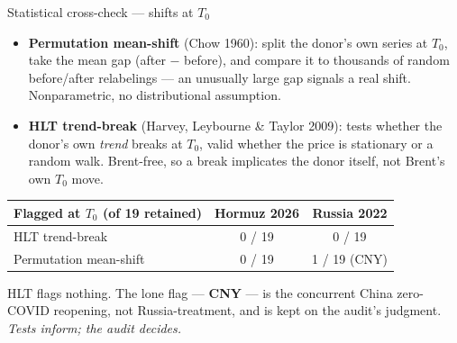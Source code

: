 \documentclass[aspectratio=169,11pt]{beamer}
\newcommand{\src}[1]{{\footnotesize\textcolor{muted}{(#1)}}}
\newcommand{\smalltext}[1]{{\footnotesize\textcolor{muted}{#1}}}
\newcommand{\hd}[1]{\textbf{#1}}
\begin{document}
\begin{frame}{Statistical cross-check --- shifts at $T_0$}
  \begin{itemize}\setlength\itemsep{0.3em}
    \item \hd{Permutation mean-shift} \src{Chow 1960}: split the donor's own series at $T_0$, take the
      mean gap (after $-$ before), and compare it to thousands of random before/after relabelings ---
      an unusually large gap signals a real shift. Nonparametric, no distributional assumption.
    \item \hd{HLT trend-break} \src{Harvey, Leybourne \& Taylor 2009}: tests whether the donor's own
      \emph{trend} breaks at $T_0$, valid whether the price is stationary or a random walk. Brent-free,
      so a break implicates the donor itself, not Brent's own $T_0$ move.
  \end{itemize}

  \vspace{0.4em}
  \begin{center}
  \begin{tabular}{@{}l c c@{}}
    \toprule
    \hd{Flagged at $T_0$ (of 19 retained)} & \hd{Hormuz 2026} & \hd{Russia 2022} \\
    \midrule
    HLT trend-break        & 0 / 19 & 0 / 19 \\
    Permutation mean-shift & 0 / 19 & 1 / 19 \smalltext{(CNY)} \\
    \bottomrule
  \end{tabular}
  \end{center}

  \vspace{0.4em}
  \smalltext{HLT flags nothing. The lone flag --- \hd{CNY} --- is the concurrent China zero-COVID
  reopening, not Russia-treatment, and is kept on the audit's judgment. \emph{Tests inform; the audit decides.}}
\end{frame}
\end{document}
